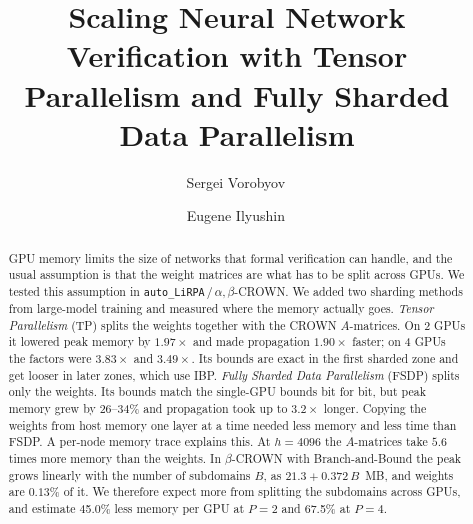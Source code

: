 \documentclass[runningheads]{llncs}
\renewcommand{\orcidID}[1]{\,\orcidlink{#1}}
\begin{document}
\title{Scaling Neural Network Verification with Tensor Parallelism and Fully Sharded Data Parallelism}


\author{Sergei Vorobyov\orcidID{0009-0002-9372-8609} \and
Eugene Ilyushin\orcidID{0000-0002-9891-8658}}



\maketitle

\begin{abstract}
GPU memory limits the size of networks that formal verification can handle, and
the usual assumption is that the weight matrices are what has to be split across
GPUs. We tested this assumption in \texttt{auto\_LiRPA}\,/\,$\alpha,\beta$-CROWN.
We added two sharding methods from large-model training and measured where the
memory actually goes. \emph{Tensor Parallelism} (TP) splits the weights together
with the CROWN $A$-matrices. On 2 GPUs it lowered peak memory by $1.97\times$ and
made propagation $1.90\times$ faster; on 4 GPUs the factors were $3.83\times$ and
$3.49\times$. Its bounds are exact in the first sharded zone and get looser in
later zones, which use IBP. \emph{Fully Sharded Data Parallelism} (FSDP) splits
only the weights. Its bounds match the single-GPU bounds bit for bit, but peak
memory grew by 26--34\% and propagation took up to $3.2\times$ longer. Copying
the weights from host memory one layer at a time needed less memory and less
time than FSDP. A per-node memory trace explains this. At $h{=}4096$ the
$A$-matrices take $5.6$ times more memory than the weights. In $\beta$-CROWN with
Branch-and-Bound the peak grows linearly with the number of subdomains $B$, as
$21.3 + 0.372\,B$~MB, and weights are $0.13\%$ of it. We therefore expect more
from splitting the subdomains across GPUs, and estimate 45.0\% less memory per
GPU at $P{=}2$ and 67.5\% at $P{=}4$.

\end{abstract}
\end{document}
